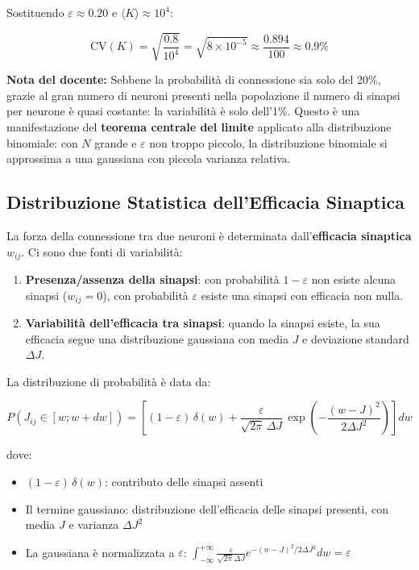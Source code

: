 Sostituendo $\varepsilon \approx 0.20$ e $\langle K \rangle \approx 10^4$:

\begin{equation}
\text{CV}(K) = \sqrt{\frac{0.8}{10^4}} = \sqrt{8 \times 10^{-5}} \approx \frac{0.894}{100} \approx 0.9\%
\end{equation}

\begin{tcolorbox}[colback=gray!5, colframe=gray!40, arc=2mm, boxrule=0.5pt]
\textbf{Nota del docente:} Sebbene la probabilità di connessione sia solo del 20\%, grazie al gran numero di neuroni presenti nella popolazione il numero di sinapsi per neurone è quasi costante: la variabilità è solo dell'1\%. Questo è una manifestazione del \textbf{teorema centrale del limite} applicato alla distribuzione binomiale: con $N$ grande e $\varepsilon$ non troppo piccolo, la distribuzione binomiale si approssima a una gaussiana con piccola varianza relativa.
\end{tcolorbox}

\subsection{Distribuzione Statistica dell'Efficacia Sinaptica}

La forza della connessione tra due neuroni è determinata dall'\textbf{efficacia sinaptica} $w_{ij}$. Ci sono due fonti di variabilità:

\begin{enumerate}
    \item \textbf{Presenza/assenza della sinapsi}: con probabilità $1-\varepsilon$ non esiste alcuna sinapsi ($w_{ij} = 0$), con probabilità $\varepsilon$ esiste una sinapsi con efficacia non nulla.
    \item \textbf{Variabilità dell'efficacia tra sinapsi}: quando la sinapsi esiste, la sua efficacia segue una distribuzione gaussiana con media $J$ e deviazione standard $\Delta J$.
\end{enumerate}


La distribuzione di probabilità è data da:

\begin{equation}
\boxed{P(J_{ij} \in [w;w+dw]) = \left[ (1-\varepsilon)\,\delta(w) + \frac{\varepsilon}{\sqrt{2\pi}\,\Delta J}\,\exp\!\left(-\frac{(w - J)^2}{2\Delta J^2}\right)\right]dw}
\end{equation}

dove:
\begin{itemize}
    \item $(1-\varepsilon)\,\delta(w)$: contributo delle sinapsi assenti 
    \item Il termine gaussiano: distribuzione dell'efficacia delle sinapsi presenti, con media $J$ e varianza $\Delta J^2$
    \item La gaussiana è normalizzata a $\varepsilon$: $\int_{-\infty}^{+\infty} \frac{\varepsilon}{\sqrt{2\pi}\Delta J} e^{-(w-J)^2/2\Delta J^2} dw = \varepsilon$
\end{itemize}

